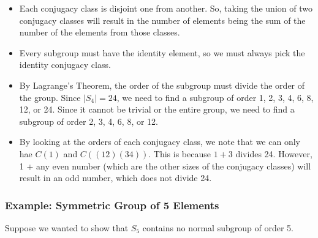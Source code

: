 \documentclass[letterpaper]{article}
\begin{document}
\begin{itemize}
    \item Each conjugacy class is disjoint one from another. So, taking the union of two conjugacy classes will result in the number of elements being the sum of the number of the elements from those classes. 
    \item Every subgroup must have the identity element, so we must always pick the identity conjugacy class. 
    \item By Lagrange's Theorem, the order of the subgroup must divide the order of the group. Since $|S_4| = 24$, we need to find a subgroup of order 1, 2, 3, 4, 6, 8, 12, or 24. Since it cannot be trivial or the entire group, we need to find a subgroup of order 2, 3, 4, 6, 8, or 12.
    \item By looking at the orders of each conjugacy class, we note that we can only hae $C(1)$ and $C((12)(34))$. This is because $1 + 3$ divides 24. However, 1 + any even number (which are the other sizes of the conjugacy classes) will result in an odd number, which does not divide 24. 
\end{itemize}


\subsubsection{Example: Symmetric Group of 5 Elements}
Suppose we wanted to show that $S_5$ contains no normal subgroup of order 5.
\end{document}
